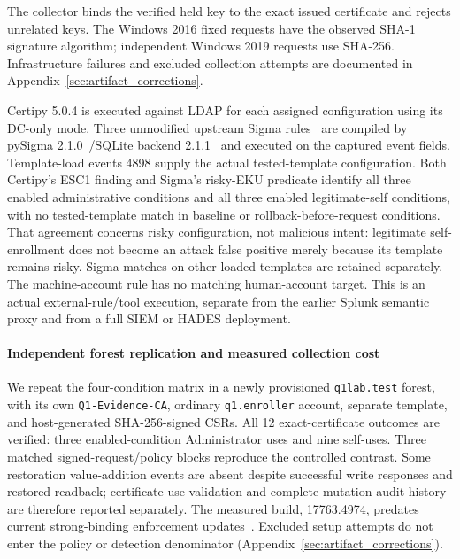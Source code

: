 The collector binds the verified held key to the exact issued certificate and rejects unrelated keys. The Windows 2016 fixed requests have the observed SHA-1 signature algorithm; independent Windows 2019 requests use SHA-256. Infrastructure failures and excluded collection attempts are documented in Appendix~\ref{sec:artifact_corrections}.

Certipy 5.0.4 is executed against LDAP for each assigned configuration using its DC-only mode. Three unmodified upstream Sigma rules~\cite{sigma2026rules} are compiled by pySigma 2.1.0~\cite{pysigma210}/SQLite backend 2.1.1~\cite{pysigma_sqlite211} and executed on the captured event fields. Template-load events 4898 supply the actual tested-template configuration. Both Certipy's ESC1 finding and Sigma's risky-EKU predicate identify all three enabled administrative conditions and all three enabled legitimate-self conditions, with no tested-template match in baseline or rollback-before-request conditions. That agreement concerns risky configuration, not malicious intent: legitimate self-enrollment does not become an attack false positive merely because its template remains risky. Sigma matches on other loaded templates are retained separately. The machine-account rule has no matching human-account target. This is an actual external-rule/tool execution, separate from the earlier Splunk semantic proxy and from a full SIEM or HADES deployment.

\paragraph{Independent forest replication and measured collection cost}
We repeat the four-condition matrix in a newly provisioned \texttt{q1lab.test} forest, with its own \texttt{Q1-Evidence-CA}, ordinary \texttt{q1.enroller} account, separate template, and host-generated SHA-256-signed CSRs. All 12 exact-certificate outcomes are verified: three enabled-condition Administrator uses and nine self-uses. Three matched signed-request/policy blocks reproduce the controlled contrast. Some restoration value-addition events are absent despite successful write responses and restored readback; certificate-use validation and complete mutation-audit history are therefore reported separately. The measured build, 17763.4974, predates current strong-binding enforcement updates~\cite{microsoft2025strongbinding}. Excluded setup attempts do not enter the policy or detection denominator (Appendix~\ref{sec:artifact_corrections}).

